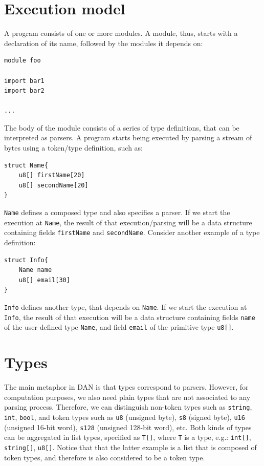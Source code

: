\documentclass[10pt,oneside]{article}
\begin{document}
\hypertarget{execution-model}{%
\section{Execution model}\label{execution-model}}

A program consists of one or more modules. A module, thus, starts with a
declaration of its name, followed by the modules it depends on:

\begin{verbatim}
module foo

import bar1
import bar2

...
\end{verbatim}

The body of the module consists of a series of type definitions, that
can be interpreted as parsers. A program starts being executed by
parsing a stream of bytes using a token/type definition, such as:

\begin{verbatim}
struct Name{
    u8[] firstName[20]
    u8[] secondName[20]
}
\end{verbatim}

\texttt{Name} defines a composed type and also specifies a parser. If we
start the execution at \texttt{Name}, the result of that
execution/parsing will be a data structure containing fields
\texttt{firstName} and \texttt{secondName}. Consider another example of
a type definition:

\begin{verbatim}
struct Info{
    Name name
    u8[] email[30]
}
\end{verbatim}

\texttt{Info} defines another type, that depends on \texttt{Name}. If we
start the execution at \texttt{Info}, the result of that execution will
be a data structure containing fields \texttt{name} of the user-defined
type \texttt{Name}, and field \texttt{email} of the primitive type
\texttt{u8{[}{]}}.

\hypertarget{types}{%
\section{Types}\label{types}}

The main metaphor in DAN is that types correspond to parsers. However,
for computation purposes, we also need plain types that are not
associated to any parsing process. Therefore, we can distinguish
non-token types such as \texttt{string}, \texttt{int}, \texttt{bool},
and token types such as \texttt{u8} (unsigned byte), \texttt{s8} (signed
byte), \texttt{u16} (unsigned 16-bit word), \texttt{s128} (unsigned
128-bit word), etc. Both kinds of types can be aggregated in list types,
specified as \texttt{T{[}{]}}, where \texttt{T} is a type, e.g.:
\texttt{int{[}{]}}, \texttt{string{[}{]}}, \texttt{u8{[}{]}}. Notice
that that the latter example is a list that is composed of token types,
and therefore is also considered to be a token type.
\end{document}
